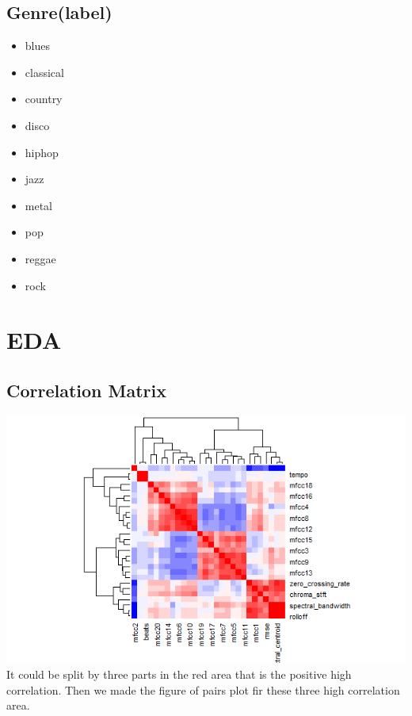 \documentclass[12pt,a4paper]{article}
\begin{document}
\subsection{Genre(label)}
\begin{itemize}
  \item blues
  \item classical
  \item country
  \item disco
  \item hiphop
  \item jazz
  \item metal
  \item pop
  \item reggae
  \item rock 
\end{itemize}

\newpage
\section{EDA}
\subsection{Correlation Matrix}
\includegraphics[width=1.2\textwidth]{correlation_matrix.png}
\\
It could be split by three parts in the red area that is the positive high correlation. Then we made the figure of pairs plot fir these three high correlation area.
\end{document}
